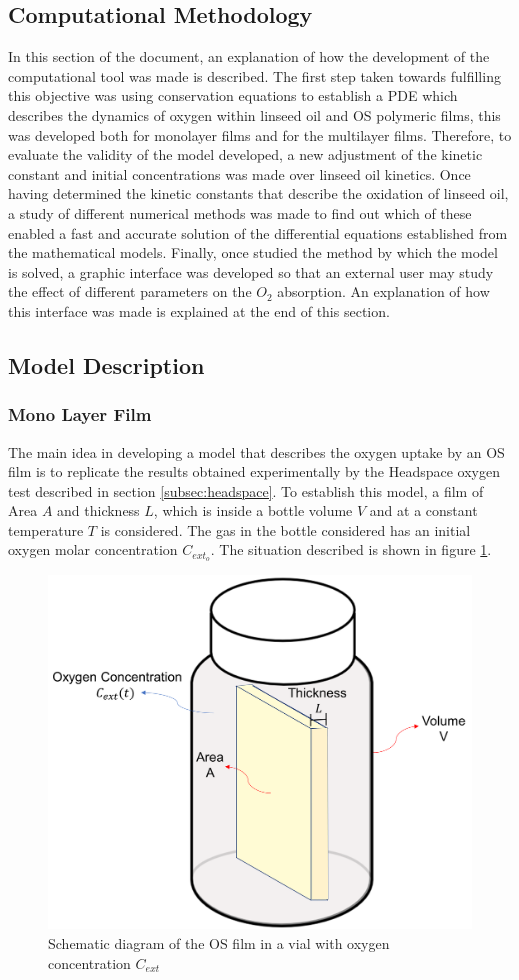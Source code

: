 \begin{refsection}
\section{Computational Methodology}
In this section of the document, an explanation of how the development of the computational tool was made is described. The first step taken towards fulfilling this objective was using conservation equations to establish a PDE which describes the dynamics of oxygen within linseed oil and OS polymeric films, this was developed both for monolayer films and for the multilayer films. Therefore, to evaluate the validity of the model developed, a new adjustment of the kinetic constant and initial concentrations was made over linseed oil kinetics. Once having determined the kinetic constants that describe the oxidation of linseed oil, a study of different numerical methods was made to find out which of these enabled a fast and accurate solution of the differential equations established from the mathematical models. Finally, once studied the method by which the model is solved, a graphic interface was developed so that an external user may study the effect of different parameters on the $O_2$ absorption. An explanation of how this interface was made is explained at the end of this section. 

\subsection{Model Description}\label{subsec:model_desc.}

\subsubsection{Mono Layer Film}
The main idea in developing a model that describes the oxygen uptake by an OS film is to replicate the results obtained experimentally by the Headspace oxygen test described in section \ref{subsec:headspace}. To establish this model, a film of Area $A$ and thickness $L$, which is inside a bottle volume $V$ and at a constant temperature $T$ is considered. The gas in the bottle considered has an initial oxygen molar concentration $C_{ext_o}$. The situation described is shown in figure \ref{fig:model_diagram}. 

\begin{figure}[ht]
    \centering
    \includegraphics[width=0.5\linewidth]{Documento_Latex/Imagenes/modelo.png}
    \caption{Schematic diagram of the OS film in a vial with oxygen concentration $C_{ext}$}
    \label{fig:model_diagram}
\end{figure}


\end{refsection}
